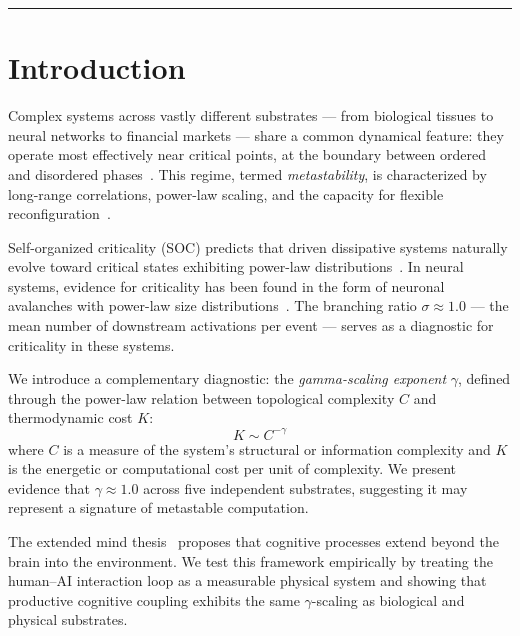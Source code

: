 \documentclass[11pt,a4paper,twocolumn]{article}
\begin{document}
\vspace{0.5em}
\noindent\rule{\textwidth}{0.4pt}
\vspace{0.3em}

\section{Introduction}

Complex systems across vastly different substrates --- from biological tissues to neural networks to financial markets --- share a common dynamical feature: they operate most effectively near critical points, at the boundary between ordered and disordered phases~\cite{bak1987,beggs2003}. This regime, termed \emph{metastability}, is characterized by long-range correlations, power-law scaling, and the capacity for flexible reconfiguration~\cite{maass2002}.

Self-organized criticality (SOC) predicts that driven dissipative systems naturally evolve toward critical states exhibiting power-law distributions~\cite{bak1987}. In neural systems, evidence for criticality has been found in the form of neuronal avalanches with power-law size distributions~\cite{beggs2003}. The branching ratio $\sigma \approx 1.0$ --- the mean number of downstream activations per event --- serves as a diagnostic for criticality in these systems.

We introduce a complementary diagnostic: the \emph{gamma-scaling exponent} $\gamma$, defined through the power-law relation between topological complexity $C$ and thermodynamic cost $K$:
\begin{equation}
K \sim C^{-\gamma}
\end{equation}
where $C$ is a measure of the system's structural or information complexity and $K$ is the energetic or computational cost per unit of complexity. We present evidence that $\gamma \approx 1.0$ across five independent substrates, suggesting it may represent a signature of metastable computation.

The extended mind thesis~\cite{clark1998} proposes that cognitive processes extend beyond the brain into the environment. We test this framework empirically by treating the human--AI interaction loop as a measurable physical system and showing that productive cognitive coupling exhibits the same $\gamma$-scaling as biological and physical substrates.
\end{document}
